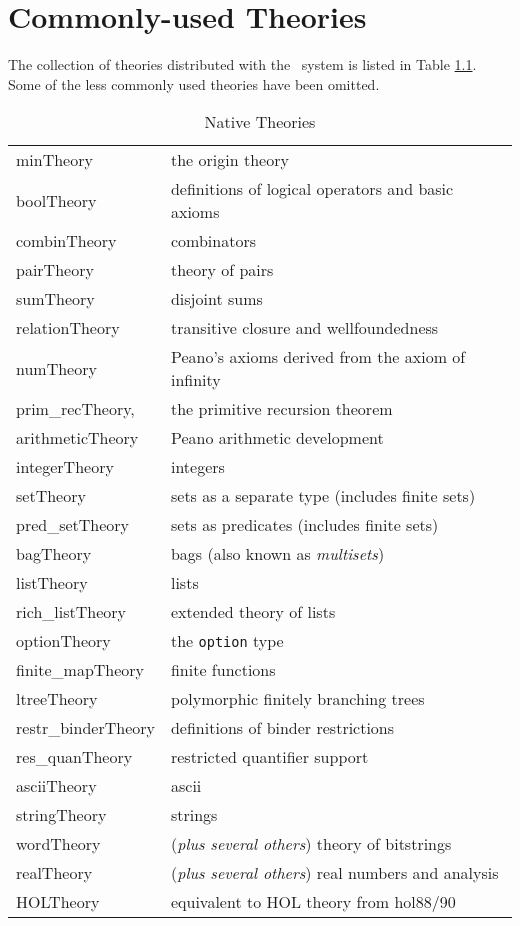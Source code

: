 \chapter{Commonly-used Theories}\label{HOLtheories}

The collection of theories distributed with the \HOL\ system
is listed in Table \ref{nativeTheories}. Some of the less commonly used
theories have been omitted.

\begin{table}
\begin{center}
\begin{tabular}{|l|l|} \hline
minTheory & the origin theory \\
boolTheory & definitions of logical operators and basic axioms \\
combinTheory & combinators \\
pairTheory & theory of pairs \\
sumTheory & disjoint sums \\
relationTheory & transitive closure and wellfoundedness \\
numTheory & Peano's axioms derived from the axiom of infinity \\
prim\_recTheory, & the primitive recursion theorem \\
arithmeticTheory & Peano arithmetic development \\
integerTheory & integers \\
setTheory & sets as a separate type (includes finite sets) \\
pred\_setTheory & sets as predicates (includes finite sets) \\
bagTheory & bags (also known as \emph{multisets})\\
listTheory & lists  \\
rich\_listTheory & extended theory of lists \\
optionTheory & the {\tt option} type \\
finite\_mapTheory & finite functions \\
ltreeTheory & polymorphic finitely branching trees \\
restr\_binderTheory & definitions of binder restrictions \\
res\_quanTheory & restricted quantifier support \\
asciiTheory & ascii \\
stringTheory & strings \\
wordTheory & ({\it plus several others}) theory of bitstrings \\
realTheory & ({\it plus several others}) real numbers and analysis \\
HOLTheory & equivalent to HOL theory from hol88/90\\  \hline
\end{tabular}
\caption{Native Theories}\label{nativeTheories}
\end{center}
\end{table}

